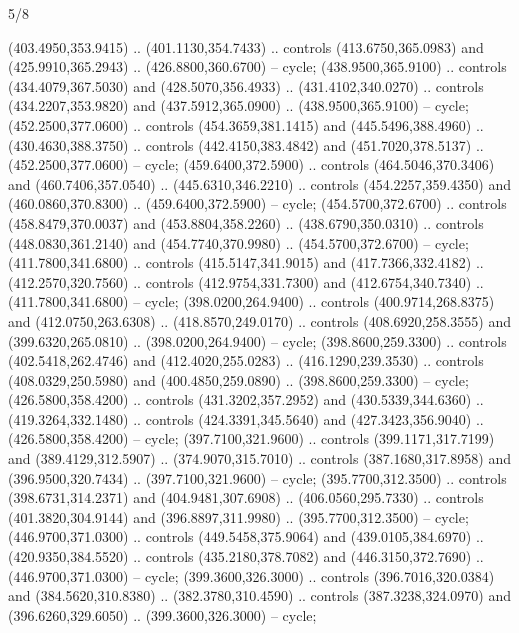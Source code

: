 \begin{flagdescription}{5/8}
\begin{scope}[shift={(0.5\flaglength,0.5\flagwidth)},scale=\flagwidth*\stretchfactor/820]
\begin{scope}[scale=1.84,xshift=-135mm,yshift=84mm]
\begin{scope}[y=0.80pt, x=0.80pt, yscale=-1, xscale=1]
\begin{scope}[cm={{1.01416,0.0,0.0,1.033,(-6.79641,-9.89449)}}]
\begin{scope}[draw=c24420e]
\begin{scope}[line width=0.131\lw]
\begin{scope}[fill=c406325]
  (403.4950,353.9415) .. (401.1130,354.7433) .. controls (413.6750,365.0983) and
  (425.9910,365.2943) .. (426.8800,360.6700) -- cycle;
 (438.9500,365.9100) .. controls (434.4079,367.5030) and
  (428.5070,356.4933) .. (431.4102,340.0270) .. controls (434.2207,353.9820) and
  (437.5912,365.0900) .. (438.9500,365.9100) -- cycle;
 (452.2500,377.0600) .. controls (454.3659,381.1415) and
  (445.5496,388.4960) .. (430.4630,388.3750) .. controls (442.4150,383.4842) and
  (451.7020,378.5137) .. (452.2500,377.0600) -- cycle;
 (459.6400,372.5900) .. controls (464.5046,370.3406) and
  (460.7406,357.0540) .. (445.6310,346.2210) .. controls (454.2257,359.4350) and
  (460.0860,370.8300) .. (459.6400,372.5900) -- cycle;
 (454.5700,372.6700) .. controls (458.8479,370.0037) and
  (453.8804,358.2260) .. (438.6790,350.0310) .. controls (448.0830,361.2140) and
  (454.7740,370.9980) .. (454.5700,372.6700) -- cycle;
 (411.7800,341.6800) .. controls (415.5147,341.9015) and
  (417.7366,332.4182) .. (412.2570,320.7560) .. controls (412.9754,331.7300) and
  (412.6754,340.7340) .. (411.7800,341.6800) -- cycle;
 (398.0200,264.9400) .. controls (400.9714,268.8375) and
  (412.0750,263.6308) .. (418.8570,249.0170) .. controls (408.6920,258.3555) and
  (399.6320,265.0810) .. (398.0200,264.9400) -- cycle;
 (398.8600,259.3300) .. controls (402.5418,262.4746) and
  (412.4020,255.0283) .. (416.1290,239.3530) .. controls (408.0329,250.5980) and
  (400.4850,259.0890) .. (398.8600,259.3300) -- cycle;
 (426.5800,358.4200) .. controls (431.3202,357.2952) and
  (430.5339,344.6360) .. (419.3264,332.1480) .. controls (424.3391,345.5640) and
  (427.3423,356.9040) .. (426.5800,358.4200) -- cycle;
 (397.7100,321.9600) .. controls (399.1171,317.7199) and
  (389.4129,312.5907) .. (374.9070,315.7010) .. controls (387.1680,317.8958) and
  (396.9500,320.7434) .. (397.7100,321.9600) -- cycle;
 (395.7700,312.3500) .. controls (398.6731,314.2371) and
  (404.9481,307.6908) .. (406.0560,295.7330) .. controls (401.3820,304.9144) and
  (396.8897,311.9980) .. (395.7700,312.3500) -- cycle;
 (446.9700,371.0300) .. controls (449.5458,375.9064) and
  (439.0105,384.6970) .. (420.9350,384.5520) .. controls (435.2180,378.7082) and
  (446.3150,372.7690) .. (446.9700,371.0300) -- cycle;
 (399.3600,326.3000) .. controls (396.7016,320.0384) and
  (384.5620,310.8380) .. (382.3780,310.4590) .. controls (387.3238,324.0970) and
  (396.6260,329.6050) .. (399.3600,326.3000) -- cycle;

\end{scope}
\end{scope}
\end{scope}
\end{scope}
\end{scope}
\end{scope}
\end{scope}
\end{flagdescription}
